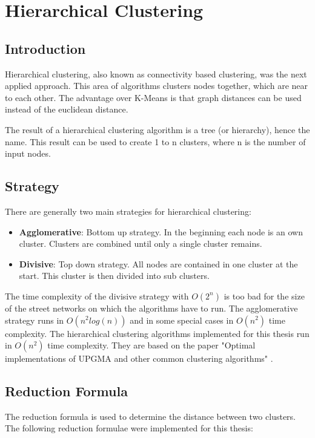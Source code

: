 \section{Hierarchical Clustering} \label{sec:hierarchicalClustering}
\subsection{Introduction}
Hierarchical clustering, also known as connectivity based clustering, was the next applied approach. This area of algorithms clusters nodes together, which are near to each other. The advantage over K-Means is that graph distances can be used instead of the euclidean distance.

The result of a hierarchical clustering algorithm is a tree (or hierarchy), hence the name. This result can be used to create 1 to n clusters, where n is the number of input nodes.

\subsection{Strategy}
There are generally two main strategies for hierarchical clustering:

\begin{itemize}
    \item \textbf{Agglomerative}: Bottom up strategy. In the beginning each node is an own cluster. Clusters are combined until only a single cluster remains.
    \item \textbf{Divisive}: Top down strategy. All nodes are contained in one cluster at the start. This cluster is then divided into sub clusters.
\end{itemize}

The time complexity of the divisive strategy with $O(2^n)$ is too bad for the size of the street networks on which the algorithms have to run. The agglomerative strategy runs in $O(n^2 log(n))$ and in some special cases in $O(n^2)$ time complexity. The hierarchical clustering algorithms implemented for this thesis run in $O(n^2)$ time complexity. They are based on the paper "Optimal implementations of UPGMA and other common clustering algorithms" \cite{clustering:2007}.

\subsection{Reduction Formula}
The reduction formula is used to determine the distance between two clusters.
The following reduction formulae were implemented for this thesis:

